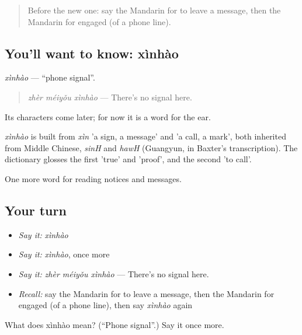 \label{lesson:ZH-C198-xinhao}



\begin{quote}
Before the new one: say the Mandarin for to leave a message, then the Mandarin for engaged (of a phone line).
\end{quote}

\subsection*{You'll want to know: xìnhào}
\emph{xìnhào} — \textquotedblleft{}phone signal\textquotedblright{}.

\begin{quote}
\emph{zhèr méiyǒu xìnhào} — There's no signal here.
\end{quote}

Its characters come later; for now it is a word for the ear.

\begin{cousinweb}
\emph{xìnhào} is built from \emph{xìn} 'a sign, a message' and  'a call, a mark', both inherited from Middle Chinese, \emph{sinH} and \emph{hawH} (Guangyun, in Baxter's transcription). The dictionary glosses the first 'true' and 'proof', and the second 'to call'.
\end{cousinweb}

\begin{grammarlens}[title={What you've built}]
One more word for reading notices and messages.
\end{grammarlens}

\subsection*{Your turn}
\begin{itemize}
\raggedright
  \item \emph{Say it:} \emph{xìnhào}
  \item \emph{Say it:} \emph{xìnhào}, once more
  \item \emph{Say it:} \emph{zhèr méiyǒu xìnhào} — There's no signal here.
  \item \emph{Recall:} say the Mandarin for to leave a message, then the Mandarin for engaged (of a phone line), then say \emph{xìnhào} again
\end{itemize}

\begin{tcolorbox}[breakable,colback=teal!4,colframe=teal!35!black,title={Before you move on}]
What does xìnhào mean? (\textquotedblleft{}Phone signal\textquotedblright{}.) Say it once more.
\end{tcolorbox}

